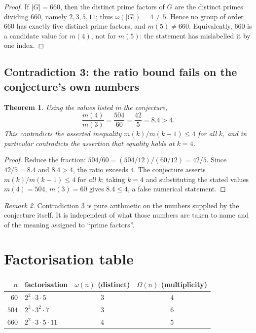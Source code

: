 \documentclass[11pt]{article}
\newtheorem{theorem}{Theorem}
\theoremstyle{definition}
\theoremstyle{remark}
\newtheorem{remark}[theorem]{Remark}
\begin{document}
\begin{proof}
If $|G| = 660$, then the distinct prime factors of $G$ are the distinct primes
dividing $660$, namely $2, 3, 5, 11$; thus $\omega(|G|) = 4 \ne 5$. Hence no group of
order $660$ has exactly five distinct prime factors, and $m(5) \ne 660$. Equivalently,
$660$ is a candidate value for $m(4)$, not for $m(5)$: the statement has mislabelled
it by one index.
\end{proof}

\subsection*{Contradiction 3: the ratio bound fails on the conjecture's own numbers}

\begin{theorem}
Using the values listed in the conjecture,
\[
\frac{m(4)}{m(3)} = \frac{504}{60} = \frac{42}{5} = 8.4 > 4 .
\]
This contradicts the asserted inequality $m(k)/m(k-1) \le 4$ for all $k$, and in
particular contradicts the assertion that equality holds at $k = 4$.
\end{theorem}

\begin{proof}
Reduce the fraction: $504/60 = (504/12)/(60/12) = 42/5$. Since
$42/5 = 8.4$ and $8.4 > 4$, the ratio exceeds $4$. The conjecture asserts
$m(k)/m(k-1) \le 4$ for \emph{all} $k$; taking $k = 4$ and substituting the stated
values $m(4) = 504$, $m(3) = 60$ gives $8.4 \le 4$, a false numerical statement.
\end{proof}

\begin{remark}
Contradiction 3 is pure arithmetic on the numbers supplied by the conjecture itself.
It is independent of what those numbers are taken to name and of the meaning assigned
to ``prime factors''.
\end{remark}

\section{Factorisation table}

\begin{center}
\begin{tabular}{r|l|c|c}
$n$ & factorisation & $\omega(n)$ (distinct) & $\Omega(n)$ (multiplicity) \\
\hline
$60$  & $2^{2}\cdot 3\cdot 5$          & $3$ & $4$ \\
$504$ & $2^{3}\cdot 3^{2}\cdot 7$      & $3$ & $6$ \\
$660$ & $2^{2}\cdot 3\cdot 5\cdot 11$  & $4$ & $5$ \\
\end{tabular}
\end{center}
\end{document}
